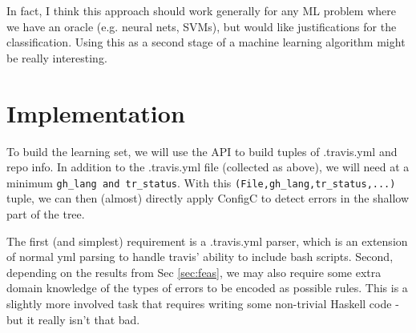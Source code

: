 \documentclass{sigplanconf}
\begin{document}
In fact, I think this approach should work generally for any ML problem where we have an oracle (e.g. neural nets, SVMs), but would like justifications for the classification.
Using this as a second stage of a machine learning algorithm might be really interesting.

\section{Implementation}

To build the learning set, we will use the API to build tuples of .travis.yml and repo info.
In addition to the .travis.yml file (collected as above), we will need at a minimum \verb|gh_lang and tr_status|.
With this \verb|(File,gh_lang,tr_status,...)| tuple, we can then (almost) directly apply ConfigC to detect errors in the shallow part of the tree.

The first (and simplest) requirement is a .travis.yml parser, which is an extension of normal yml parsing to handle travis' ability to include bash scripts.
Second, depending on the results from Sec \ref{sec:feas}, we may also require some extra domain knowledge of the types of errors to be encoded as possible rules.
This is a slightly more involved task that requires writing some non-trivial Haskell code - but it really isn't that bad.






\end{document}
